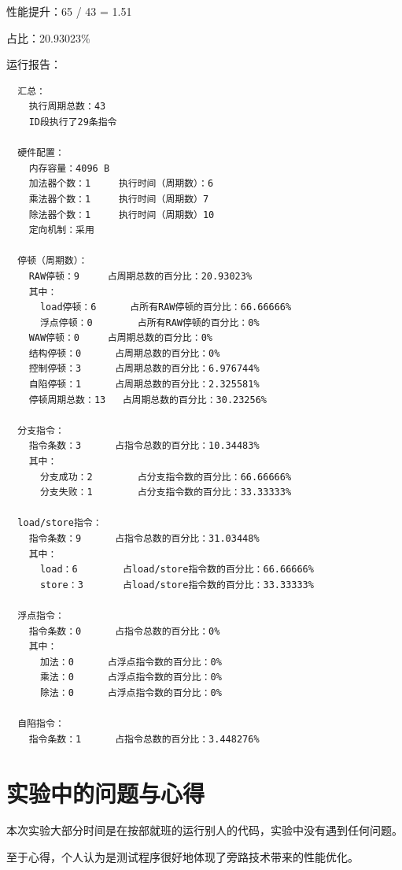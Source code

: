 \documentclass[blue,normal,cn]{elegantnote}
\begin{document}
\begin{enumerate}[wide=0pt, listparindent=2em, parsep=0pt]
\begin{itemize}[leftmargin=3em, listparindent=2em, parsep=0pt]
                    \textcolor{ans} {性能提升：65 / 43 = 1.51}

                    \textcolor{ans} {占比：20.93023\%}

                    \textcolor{ans}{运行报告：}
                    \begin{lstlisting}
  汇总：
    执行周期总数：43
    ID段执行了29条指令

  硬件配置：
    内存容量：4096 B
    加法器个数：1		执行时间（周期数）：6
    乘法器个数：1		执行时间（周期数）7		
    除法器个数：1		执行时间（周期数）10		
    定向机制：采用

  停顿（周期数）：
    RAW停顿：9		占周期总数的百分比：20.93023%
    其中：
      load停顿：6		占所有RAW停顿的百分比：66.66666%
      浮点停顿：0		占所有RAW停顿的百分比：0%
    WAW停顿：0		占周期总数的百分比：0%
    结构停顿：0		占周期总数的百分比：0%
    控制停顿：3		占周期总数的百分比：6.976744%
    自陷停顿：1		占周期总数的百分比：2.325581%
    停顿周期总数：13	占周期总数的百分比：30.23256%

  分支指令：
    指令条数：3		占指令总数的百分比：10.34483%
    其中：
      分支成功：2		占分支指令数的百分比：66.66666%
      分支失败：1		占分支指令数的百分比：33.33333%

  load/store指令：
    指令条数：9		占指令总数的百分比：31.03448%
    其中：
      load：6		占load/store指令数的百分比：66.66666%
      store：3		占load/store指令数的百分比：33.33333%

  浮点指令：
    指令条数：0		占指令总数的百分比：0%
    其中：
      加法：0		占浮点指令数的百分比：0%
      乘法：0		占浮点指令数的百分比：0%
      除法：0		占浮点指令数的百分比：0%

  自陷指令：
    指令条数：1		占指令总数的百分比：3.448276%
\end{lstlisting}
          \end{itemize}
\end{enumerate}

\section{实验中的问题与心得}

本次实验大部分时间是在按部就班的运行别人的代码，实验中没有遇到任何问题。

至于心得，个人认为是测试程序很好地体现了旁路技术带来的性能优化。
\end{document}
